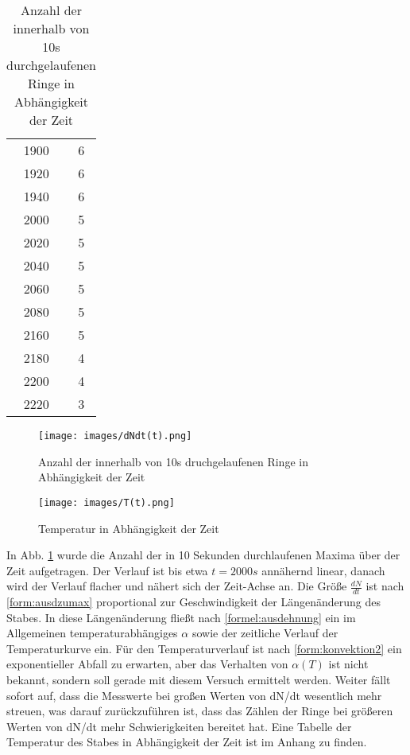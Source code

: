 \begin{table}
\begin{tabular}{c|c}
1900&	6\\ 

1920&	6\\ 

1940&	6\\ 

2000&	5\\ 

2020&	5\\ 

2040&	5\\ 

2060&	5\\ 

2080&	5\\ 

2160&	5\\ 

2180&	4\\ 

2200&	4\\ 

2220&	3\\ 

\end{tabular} 
\caption{Anzahl der innerhalb von 10s durchgelaufenen Ringe in Abhängigkeit der Zeit}
\label{tbl_1}
\end{table}

\begin{figure}
\centering
        \texttt{[image: images/dNdt(t).png]}
\caption{Anzahl der innerhalb von 10s druchgelaufenen Ringe in Abhängigkeit der Zeit}
\label{dNdt(t)}
\end{figure}


\begin{figure}
\centering
	\texttt{[image: images/T(t).png]}
\caption{Temperatur in Abhängigkeit der Zeit}
\label{plot:Tt}
\end{figure}

In Abb. \ref{dNdt(t)} wurde die Anzahl der in 10 Sekunden durchlaufenen Maxima über der Zeit aufgetragen. Der Verlauf
ist bis etwa $ t = 2000 s$ annähernd linear, danach wird der Verlauf flacher und nähert sich der Zeit-Achse an. Die Größe
$ \frac{dN}{dt} $ ist nach \eqref{form:ausdzumax} proportional zur Geschwindigkeit der Längenänderung des Stabes. In diese
Längenänderung fließt nach \eqref{formel:ausdehnung} ein im Allgemeinen temperaturabhängiges $ \alpha $ sowie der zeitliche 
Verlauf der Temperaturkurve ein. Für den Temperaturverlauf ist nach \eqref{form:konvektion2} ein exponentieller Abfall
zu erwarten, aber das Verhalten von $ \alpha(T) $ ist nicht bekannt, sondern soll gerade mit diesem Versuch ermittelt werden. 
Weiter fällt sofort auf, dass die Messwerte bei großen Werten von dN/dt wesentlich
mehr streuen, was darauf zurückzuführen ist, dass das Zählen der Ringe bei größeren Werten von dN/dt mehr 
Schwierigkeiten bereitet hat.
Eine Tabelle der Temperatur des Stabes in Abhängigkeit der Zeit ist im Anhang zu finden. \\


